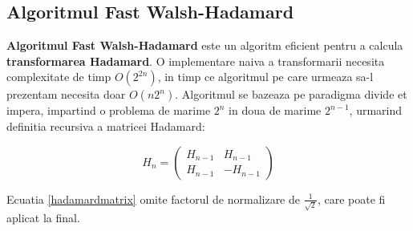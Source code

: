 \subsection{Algoritmul Fast Walsh-Hadamard}

\textbf{Algoritmul Fast Walsh-Hadamard} este un algoritm eficient pentru a
calcula \textbf{transformarea Hadamard}. O implementare naiva a transformarii
necesita complexitate de timp $O(2^{2n})$, in timp ce algoritmul pe care urmeaza
sa-l prezentam necesita doar $O(n2^{n})$. Algoritmul se bazeaza pe paradigma
divide et impera, impartind o problema de marime $2^{n}$ in doua de marime
$2^{n-1}$, urmarind definitia recursiva a matricei Hadamard:

\begin{equation}
  \label{hadamardmatrix}
  H_{n} =
  \begin{pmatrix}
    H_{n-1} & H_{n-1}\\
    H_{n-1} & -H_{n-1}
  \end{pmatrix}
\end{equation}

Ecuatia \ref{hadamardmatrix} omite factorul de normalizare de
$\frac{1}{\sqrt{2}}$, care poate fi aplicat la final.

\begin{algorithm}[H]
  \DontPrintSemicolon
  \;
\end{algorithm}

\begin{algorithm}[H]
  \DontPrintSemicolon
  \;
\end{algorithm}
